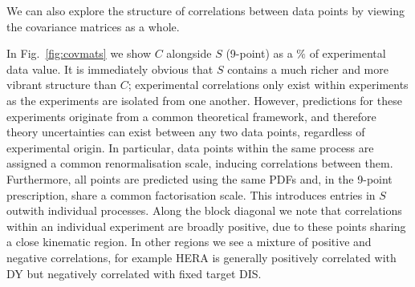 We can also explore the structure of correlations between data points by viewing the covariance matrices as a whole. 

In Fig.~\ref{fig:covmats} we show $C$ alongside $S$ (9-point) as a $\%$ of experimental data value. It is immediately obvious that $S$ contains a much richer and more vibrant structure than $C$; experimental correlations only exist within experiments as the experiments are isolated from one another. However, predictions for these experiments originate from a common theoretical framework, and therefore theory uncertainties can exist between any two data points, regardless of experimental origin. In particular, data points within the same process are assigned a common renormalisation scale, inducing correlations between them. Furthermore, all points are predicted using the same PDFs and, in the 9-point prescription, share a common factorisation scale. This introduces entries in $S$ outwith individual processes. Along the block diagonal we note that correlations within an individual experiment are broadly positive, due to these points sharing a close kinematic region. In other regions we see a mixture of positive and negative correlations, for example HERA is generally positively correlated with DY but negatively correlated with fixed target DIS. 
